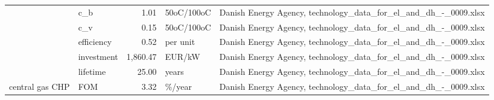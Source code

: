 \begin{longtable}{p{5cm}p{3cm}rp{3cm}p{11cm}}
                      & c\_b &           1.01 &                        50oC/100oC &                                                                                                                                                                                                                                                                      Danish Energy Agency, technology\_data\_for\_el\_and\_dh\_-\_0009.xlsx \\
                      & c\_v &           0.15 &                        50oC/100oC &                                                                                                                                                                                                                                                                      Danish Energy Agency, technology\_data\_for\_el\_and\_dh\_-\_0009.xlsx \\
                      & efficiency &           0.52 &                          per unit &                                                                                                                                                                                                                                                                      Danish Energy Agency, technology\_data\_for\_el\_and\_dh\_-\_0009.xlsx \\
                      & investment &       1,860.47 &                            EUR/kW &                                                                                                                                                                                                                                                                      Danish Energy Agency, technology\_data\_for\_el\_and\_dh\_-\_0009.xlsx \\
                      & lifetime &          25.00 &                             years &                                                                                                                                                                                                                                                                      Danish Energy Agency, technology\_data\_for\_el\_and\_dh\_-\_0009.xlsx \\
central gas CHP & FOM &           3.32 &                            \%/year &                                                                                                                                                                                                                                                                      Danish Energy Agency, technology\_data\_for\_el\_and\_dh\_-\_0009.xlsx \\

\end{longtable}
